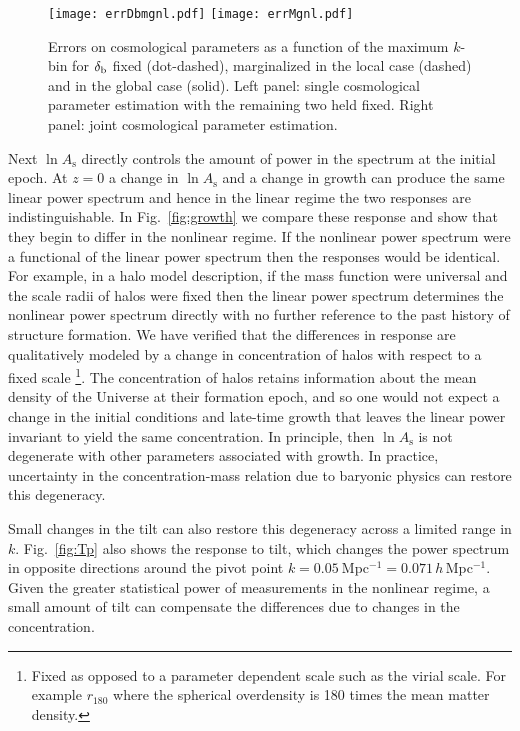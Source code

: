 \documentclass[prd,twocolumn,amsmath,amssymb,floatfix,superscriptaddress]{revtex4-1}
\newcommand{\lnAs}{{\ln\!A_\textrm{s}}}
\newcommand{\br}{{\rm b}}
\newcommand{\hMpci}{$h\,$Mpc$^{-1}$}
\begin{document}
{{\begin{figure*}[tb]
    \centering
    \texttt{[image: errDbmgnl.pdf]}
     \texttt{[image: errMgnl.pdf]}
    \caption{
        \footnotesize  Errors on cosmological parameters as a function of the maximum 
        $k$-bin for $\delta_\br$ fixed (dot-dashed), marginalized in the local case
        (dashed) and in the global case (solid).  Left panel: single cosmological parameter
        estimation with the remaining two held fixed.
        Right panel: joint cosmological parameter estimation.  
    }
    \label{fig:kmaxcosmo}
\end{figure*}


Next $\lnAs$ directly controls the amount of  power in the spectrum at the initial epoch.   At $z=0$ a change in $\lnAs$
and a change in growth can produce the same linear power spectrum and hence in the linear regime the
two responses are indistinguishable.      In Fig.~\ref{fig:growth}
we compare these response and show that they begin to differ in the
nonlinear regime.    If the nonlinear power spectrum
were a 
functional 
of the linear power spectrum then the responses would be identical. 
For example, in a halo model description, if the mass function were universal and the
scale radii of halos {were}
fixed then the linear power spectrum determines the nonlinear 
power spectrum directly with no further reference to the past history of structure formation. 
We have verified that  the differences in response are qualitatively modeled by a 
change in concentration of halos with respect to a fixed scale \footnote{Fixed as opposed to a parameter dependent scale such as the virial scale.  For example $r_{180}$ where
the spherical overdensity is 180 times the mean matter density.}.
The concentration of halos retains information about the 
{mean}
density of the Universe at
their formation epoch, 
and so one would not expect a change in the initial conditions
and late-time growth that leaves the linear power invariant  to yield the same concentration.
In principle, then $\lnAs$ is not degenerate with other parameters associated with growth.
In practice,  uncertainty in the concentration-mass relation due to baryonic physics
can restore this degeneracy.   



Small changes in the tilt can also restore this degeneracy across a limited range in $k$.  
Fig.~\ref{fig:Tp} also shows the response to tilt, which changes the
power spectrum in opposite directions around the pivot point $k=0.05~${Mpc}$^{-1}=0.071\,$\hMpci.  Given the greater statistical power of measurements in the nonlinear regime, a small
amount of tilt can compensate the differences due to changes in the concentration.

}}
\end{document}
